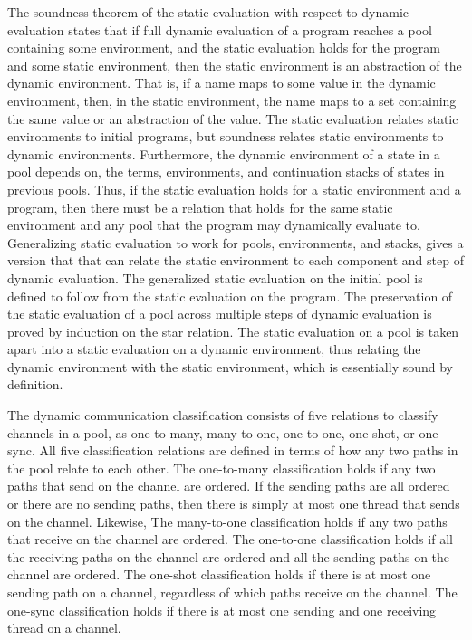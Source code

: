 \documentclass[letterpaper, 11pt]{report}
\begin{document}
The soundness theorem of the static evaluation with respect to dynamic evaluation states that if full dynamic evaluation
of a program reaches a pool containing some environment, and the static evaluation holds for the program and some
static environment, then the static environment is an abstraction of the dynamic environment. That is, if a name maps
to some value in the dynamic environment, then, in the static environment, the name maps to a set containing the same value
or an abstraction of the value. The static evaluation relates static environments to initial programs,
but soundness relates static environments
to dynamic environments. Furthermore, the dynamic environment of a state in a pool depends on, the terms, environments,
and continuation stacks of states in previous pools.
Thus, if the static evaluation holds for a static environment and a program,
then there must be a relation that holds for the same static environment and
any pool that the program may dynamically evaluate to. 
Generalizing static evaluation to work for pools, environments, and stacks, gives a version that
that can relate the static environment to each component and step of dynamic evaluation.
The generalized static evaluation on the initial pool is defined to follow from the static evaluation on the program.
The preservation of the static evaluation of a pool across multiple steps of dynamic evaluation is proved by induction on
the star relation. The static evaluation on a pool is taken apart into a static evaluation on a dynamic environment,
thus relating the dynamic environment with the static environment, which is essentially sound by definition. 


The dynamic communication classification consists of five relations to classify channels in a pool, as one-to-many,
many-to-one, one-to-one, one-shot, or one-sync. All five classification relations are defined in terms of how any two paths   
in the pool relate to each other. The one-to-many classification holds if any two paths that send on the channel are ordered. 
If the sending paths are all ordered or there are no sending paths, then there is simply at most one thread that
sends on the channel. Likewise, The many-to-one classification holds if any two paths that receive on the channel are ordered.
The one-to-one classification holds if all the receiving paths on the channel are ordered and all the sending paths on the
channel are ordered. The one-shot classification holds if there is at most one sending path on a channel, regardless
of which paths receive on the channel. The one-sync classification holds if there is at most one sending and one receiving thread on a channel.
\end{document}
